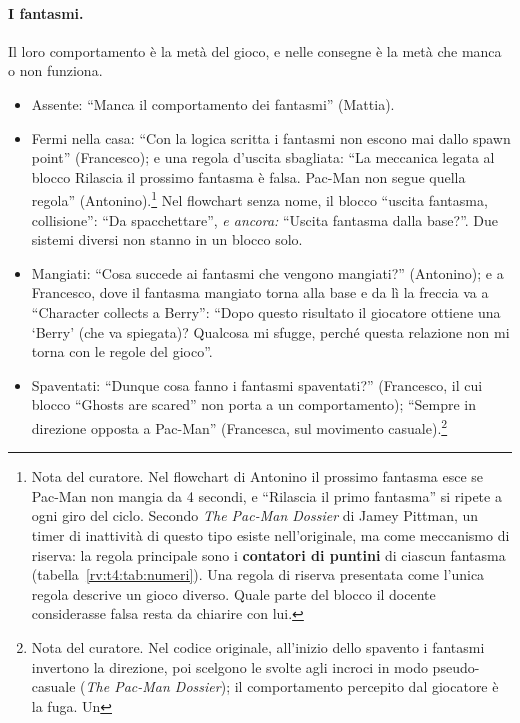 \paragraph{I fantasmi.} Il loro comportamento è la metà del gioco, e nelle
consegne è la metà che manca o non funziona.
\begin{itemize}
  \item Assente: ``Manca il comportamento dei fantasmi'' (Mattia).
  \item Fermi nella casa: ``Con la logica scritta i fantasmi non escono mai
        dallo spawn point'' (Francesco); e una regola d'uscita sbagliata: ``La
        meccanica legata al blocco Rilascia il prossimo fantasma è falsa.
        Pac-Man non segue quella regola'' (Antonino).\footnote{Nota del
        curatore. Nel flowchart di Antonino il prossimo fantasma esce se
        Pac-Man non mangia da 4 secondi, e ``Rilascia il primo fantasma'' si
        ripete a ogni giro del ciclo. Secondo \emph{The Pac-Man Dossier} di
        Jamey Pittman, un timer di inattività di questo tipo esiste
        nell'originale, ma come meccanismo di riserva: la regola principale
        sono i \textbf{contatori di puntini} di ciascun fantasma
        (tabella~\ref{rv:t4:tab:numeri}). Una regola di riserva presentata
        come l'unica regola descrive un gioco diverso. Quale parte del blocco
        il docente considerasse falsa resta da chiarire con lui.}
        Nel flowchart senza nome, il blocco ``uscita fantasma, collisione'':
        ``Da spacchettare'', \emph{e ancora:} ``Uscita fantasma dalla
        base?''. Due sistemi diversi non stanno in un blocco solo.
  \item Mangiati: ``Cosa succede ai fantasmi che vengono mangiati?''
        (Antonino); e a Francesco, dove il fantasma mangiato torna alla base e
        da lì la freccia va a ``Character collects a Berry'': ``Dopo questo
        risultato il giocatore ottiene una `Berry' (che va spiegata)? Qualcosa
        mi sfugge, perché questa relazione non mi torna con le regole del
        gioco''.
  \item Spaventati: ``Dunque cosa fanno i fantasmi spaventati?'' (Francesco,
        il cui blocco ``Ghosts are scared'' non porta a un comportamento);
        ``Sempre in direzione opposta a Pac-Man'' (Francesca, sul movimento
        casuale).\footnote{Nota del curatore. Nel codice originale, all'inizio
        dello spavento i fantasmi invertono la direzione, poi scelgono le
        svolte agli incroci in modo pseudo-casuale (\emph{The Pac-Man
        Dossier}); il comportamento percepito dal giocatore è la fuga. Un
}
\end{itemize}
